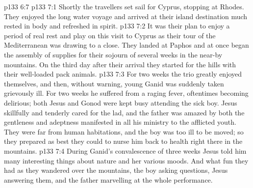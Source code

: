 \vs p133 6:7 
\vs p133 7:1 Shortly the travellers set sail for Cyprus, stopping at Rhodes. They enjoyed the long water voyage and arrived at their island destination much rested in body and refreshed in spirit.
\vs p133 7:2 It was their plan to enjoy a period of real rest and play on this visit to Cyprus as their tour of the Mediterranean was drawing to a close. They landed at Paphos and at once began the assembly of supplies for their sojourn of several weeks in the near\hyp{}by mountains. On the third day after their arrival they started for the hills with their well\hyp{}loaded pack animals.
\vs p133 7:3 For two weeks the trio greatly enjoyed themselves, and then, without warning, young Ganid was suddenly taken grievously ill. For two weeks he suffered from a raging fever, oftentimes becoming delirious; both Jesus and Gonod were kept busy attending the sick boy. Jesus skillfully and tenderly cared for the lad, and the father was amazed by both the gentleness and adeptness manifested in all his ministry to the afflicted youth. They were far from human habitations, and the boy was too ill to be moved; so they prepared as best they could to nurse him back to health right there in the mountains.
\vs p133 7:4 During Ganid’s convalescence of three weeks Jesus told him many interesting things about nature and her various moods. And what fun they had as they wandered over the mountains, the boy asking questions, Jesus answering them, and the father marvelling at the whole performance.
